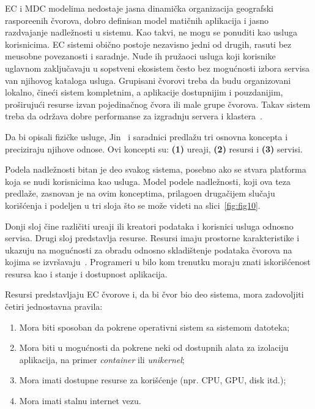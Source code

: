 EC i MDC modelima nedostaje jasna dinami\v cka organizacija geografski raspore\dj enih \v cvorova, dobro definisan model mati\v cnih aplikacija i jasno razdvajanje nadle\v znosti u sistemu. Kao takvi, ne mogu se ponuditi kao usluga korisnicima. EC sistemi obi\v cno postoje nezavisno jedni od drugih, rasuti bez me\dj usobne povezanosti i saradnje. Nude ih pru\v zaoci usluga koji korisnike uglavnom zaklju\v cavaju u sopstveni ekosistem \v cesto bez mogu\'cnosti izbora servisa van njihovog kataloga usluga. Grupisani \v cvorovi treba da budu organizovani lokalno, \v cine\'ci sistem kompletnim, a aplikacije dostupnijim i pouzdanijim, pro\v siruju\'ci resurse izvan pojedina\v cnog \v cvora ili male grupe \v cvorova. Takav sistem treba da odr\v zava dobre performanse za izgradnju servera i klastera~\cite{ArocaG12}.

Da bi opisali fizi\v cke usluge, Jin~\cite {JinCJL14} i saradnici predla\v zu tri osnovna koncepta i preciziraju njihove odnose. Ovi koncepti su: \textbf{(1)} ure\dj aji, \textbf{(2)} resursi i \textbf{(3)} servisi. 

Podela nadle\v znosti bitan je deo svakog sistema, posebno ako se stvara platforma koja se nudi korisnicima kao usluga. Model podele nadle\v znosti, koji ova teza predla\v ze, zasnovan je na ovim konceptima, prilago\dj en druga\v cijem slu\v caju kori\v s\'cenja i  podeljen u tri sloja \v sto se mo\v ze videti na slici~\ref {fig:fig10}. 

Donji sloj \v cine razli\v citi ure\dj aji ili kreatori podataka i korisnici usluga odnosno servisa. Drugi sloj predstavlja resurse. Resursi imaju prostorne karakteristike i ukazuju na mogu\'cnosti za obradu odnosno skladi\v stenje podataka \v cvorova na kojima se izvr\v savaju~\cite{JinCJL14}. Programeri u bilo kom trenutku moraju znati iskori\v s\'cenost resursa kao i stanje i dostupnost aplikacija. 

Resursi predstavljaju EC \v cvorove i, da bi \v cvor bio deo sistema, mora zadovoljiti \v cetiri jednostavna pravila: 

\begin{enumerate}[start=1,label={(\bfseries \arabic*)}]
\item Mora biti sposoban da pokrene operativni sistem sa sistemom datoteka;
\item Mora biti u mogu\'cnosti da pokrene neki od dostupnih alata za izolaciju aplikacija, na primer \textit{container} ili \textit{unikernel}; 
\item Mora imati dostupne resurse za kori\v s\'cenje (npr. CPU, GPU, disk itd.);
\item Mora imati stalnu internet vezu.
\end{enumerate}

